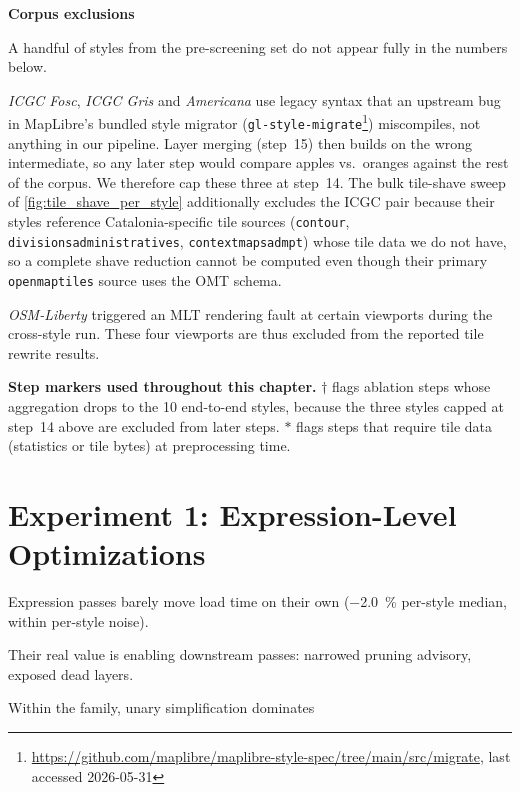 \begin{tcolorbox}[
  enhanced,
  blanker,
  borderline west={2mm}{0pt}{TUMOrange!50},
  left=5mm,
  right=0mm,
  top=1mm,
  bottom=1mm,
  before skip=12pt,
  after skip=14pt
]
\label{box:corpus_exclusions}%
\textbf{Corpus exclusions}\par\vspace{2pt}
A handful of styles from the pre-screening set do not appear fully in the numbers below.

\emph{ICGC Fosc}, \emph{ICGC Gris} and \emph{Americana} use legacy  syntax that an upstream bug in MapLibre's bundled style migrator (\texttt{gl-style-migrate}\footnote{\url{https://github.com/maplibre/maplibre-style-spec/tree/main/src/migrate}, last accessed 2026-05-31}) miscompiles, not anything in our pipeline.
Layer merging (step~15) then builds on the wrong intermediate, so any later step would compare apples vs.\ oranges against the rest of the corpus.
We therefore cap these three at step~14.
The bulk tile-shave sweep of \cref{fig:tile_shave_per_style} additionally excludes the ICGC pair because their styles reference Catalonia-specific tile sources (\texttt{contour}, \texttt{divisionsadministratives}, \texttt{contextmapsadmpt}) whose tile data we do not have, so a complete shave reduction cannot be computed even though their primary \texttt{openmaptiles} source uses the OMT schema.

\emph{OSM-Liberty} triggered an \ac{MLT} rendering fault at certain viewports during the cross-style run.
These four viewports are thus excluded from the reported tile rewrite results.

\vspace{4pt}
\textbf{\newline Step markers used throughout this chapter.}\newline
$\dagger$ flags ablation steps whose aggregation drops to the 10 end-to-end styles, because the three styles capped at step~14 above are excluded from later steps.\newline
$\ast$ flags steps that require tile data (statistics or tile bytes) at preprocessing time.
\end{tcolorbox}

\section{Experiment 1: Expression-Level Optimizations}\label{sec:exp_expressions}
\begin{keytakeaways}
\item Expression passes barely move load time on their own (\qty{-2.0}{\percent} per-style median, within per-style noise).
\item Their real value is enabling downstream passes: narrowed pruning advisory, exposed dead layers.
\item Within the family, unary simplification dominates
\end{keytakeaways}

